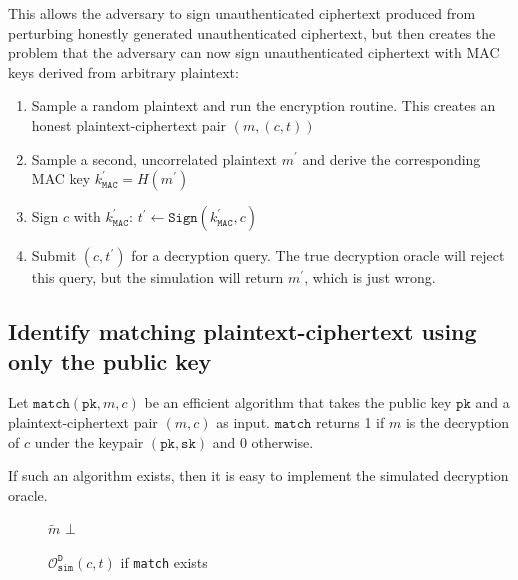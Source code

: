 \documentclass{article}
\newcommand{\monospace}{\texttt}
\newcommand{\decrypt}{\monospace{D}}
\newcommand{\mac}{\monospace{MAC}}
\newcommand{\sign}{\monospace{Sign}}
\newcommand{\verify}{\monospace{Verify}}
\newcommand{\pk}{\monospace{pk}}
\newcommand{\sk}{\monospace{sk}}
\newcommand{\oracle}[1]{\mathcal{O}^{#1}}
\begin{document}
This allows the adversary to sign unauthenticated ciphertext produced from perturbing honestly generated unauthenticated ciphertext, but then creates the problem that the adversary can now sign unauthenticated ciphertext with MAC keys derived from arbitrary plaintext:

\begin{enumerate}
    \item Sample a random plaintext and run the encryption routine. This creates an honest plaintext-ciphertext pair $(m, (c, t))$
    \item Sample a second, uncorrelated plaintext $m^\prime$ and derive the corresponding MAC key $k_\mac^\prime = H(m^\prime)$
    \item Sign $c$ with $k^\prime_\mac$: $t^\prime \leftarrow \sign(k^\prime_\mac, c)$
    \item Submit $(c, t^\prime)$ for a decryption query. The true decryption oracle will reject this query, but the simulation will return $m^\prime$, which is just wrong.
\end{enumerate}

\subsection{Identify matching plaintext-ciphertext using only the public key}
Let $\monospace{match}(\pk, m, c)$ be an efficient algorithm that takes the public key $\pk$ and a plaintext-ciphertext pair $(m, c)$ as input. $\monospace{match}$ returns 1 if $m$ is the decryption of $c$ under the keypair $(\pk, \sk)$ and 0 otherwise.

If such an algorithm exists, then it is easy to implement the simulated decryption oracle.

\begin{figure}[H]
    \begin{algorithm}[H]
        \caption{$\mathcal{O}^\decrypt_\monospace{sim}(c, t)$ if \monospace{match} exists}
        \begin{algorithmic}[1]
            \If{
                $\exists (\tilde{m}, \tilde{k}) \in \oracle{H} 
                : \monospace{match}(\tilde{m}, c) = 1
                \land \verify(\tilde{k}, c, t)
                $
            }
                \State \Return $\tilde{m}$
            \EndIf
            \State \Return $\bot$
        \end{algorithmic}
    \end{algorithm}
\end{figure}
\end{document}
